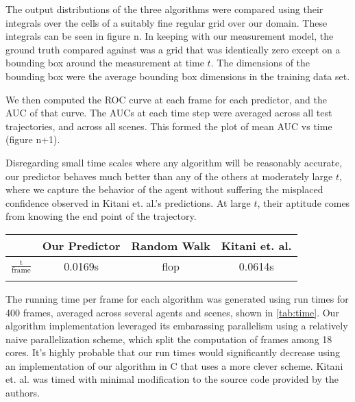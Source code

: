 \documentclass[conference]{IEEEtran}
\begin{document}
The output distributions of the three algorithms were compared using their integrals over the cells of a suitably fine regular grid over our domain. These integrals can be seen in {figure n}. 
In keeping with our measurement model, the ground truth compared against was a grid that was identically zero except on a bounding box around the measurement at time $t$. The dimensions of the bounding box were the average bounding box dimensions in the training data set. 
\label{fig:auc_vs_time}

We then computed the ROC curve at each frame for each predictor, and the AUC of that curve.  The AUCs at each time step were averaged across all test trajectories, and across all scenes. This formed the plot of mean AUC vs time ({figure n+1}). 

Disregarding small time scales where any algorithm will be reasonably accurate, our predictor behaves much better than any of the others at moderately large $t$, where we capture the  behavior of the agent without suffering the misplaced confidence observed in Kitani et. al.'s predictions. At large $t$, their aptitude comes from knowing the end point of the trajectory.  

\begin{center}
	\renewcommand{\arraystretch}{1.5}%
	\begin{tabular}{||c | c c  c ||} 
		\hline
		& Our Predictor & Random Walk & Kitani et. al. \\ [0.5ex] 
		\hline 
		$\frac{\mathrm{t}}{\mathrm{frame}}$ & 0.0169s & flop & 0.0614s \\
		\hline
	\label{tab:time}
	\end{tabular}
\end{center}

The running time per frame for each algorithm was generated using run times for 400 frames, averaged across several agents and scenes, shown in \ref{tab:time}. Our algorithm implementation leveraged its embarassing parallelism using a relatively naive parallelization scheme, which split the computation of frames among 18 cores. It's highly probable that our run times would significantly decrease using an implementation of our algorithm in C that uses a more clever scheme. Kitani et. al. was timed with minimal modification to the source code provided by the authors. 
\end{document}
